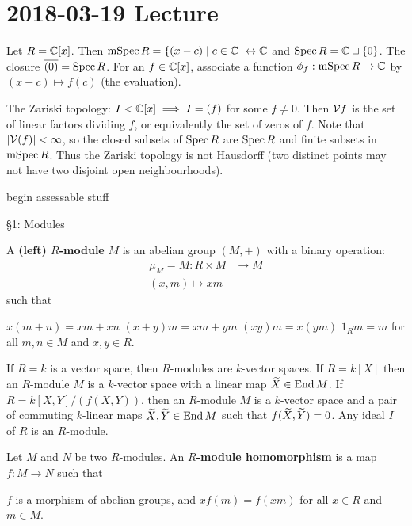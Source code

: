 \section{2018-03-19 Lecture}

\begin{exam}
	Let $R=\mathbb{C}[x]$.
	Then $\operatorname{mSpec} R = \{(x-c) \mid c \in \mathbb{C}\ \leftrightarrow \mathbb{C}$ and $\operatorname{Spec} R = \mathbb{C} \sqcup \{0\}$.
	The closure $\overline{(0)}=\operatorname{Spec} R$.
	For an $f \in \mathbb{C}[x]$, associate a function $\phi_f: \operatorname{mSpec} R \to \mathbb{C}$ by $(x-c) \mapsto f(c)$ (the evaluation).
	
	The Zariski topology: $I<\mathbb{C}[x] \implies I = (f)$ for some $f \neq 0$.
	Then $\mathcal{V}{f}$ is the set of linear factors dividing $f$, or equivalently the set of zeros of $f$.
	Note that $\left\lvert \mathcal{V}(f) \right\rvert<\infty$, so the closed subsets of $\operatorname{Spec} R$ are $\operatorname{Spec} R$ and finite subsets in $\operatorname{mSpec} R$.
	Thus the Zariski topology is not Hausdorff (two distinct points may not have two disjoint open neighbourhoods).
\end{exam}

begin assessable stuff

\S 1: Modules

\begin{defn}[1.1]
	A \textbf{(left) $R$-module} $M$ is an abelian group $(M,+)$ with a binary operation:
	\begin{align*}
		\mu_M = M: R \times M &\to M \\
		(x,m) \mapsto xm
	\end{align*}
	such that
	\begin{enum}
		\io $x(m+n)=xm+xn$
		\io $(x+y)m=xm+ym$
		\io $(xy)m=x(ym)$
		\io $1_Rm=m$
		for all $m,n \in M$ and $x,y \in R$.
	\end{enum}
\end{defn}

\begin{exam}
  	\leavevmode
	\begin{enum}
		\io If $R=k$ is a vector space, then $R$-modules are $k$-vector spaces.
		\io If $R=k[X]$ then an $R$-module $M$ is a $k$-vector space with a linear map $\widetilde{X} \in \operatorname{End} M$.
		\io If $R=k[X,Y]/(f(X,Y))$, then an $R$-module $M$ is a $k$-vector space and a pair of commuting $k$-linear maps $\widetilde{X},\widetilde{Y} \in \operatorname{End} M$ such that $f(\widetilde{X},\widetilde{Y})=0$.
		\io Any ideal $I$ of $R$ is an $R$-module.
	\end{enum}
\end{exam}

\begin{defn}[1.2]
	Let $M$ and $N$ be two $R$-modules.
	An \textbf{$R$-module homomorphism} is a map $f:M \to N$ such that
	\begin{enum}
		\io $f$ is a morphism of abelian groups, and
		\io $xf(m)=f(xm)$ for all $x \in R$ and $m \in M$.
	\end{enum}
\end{defn}

